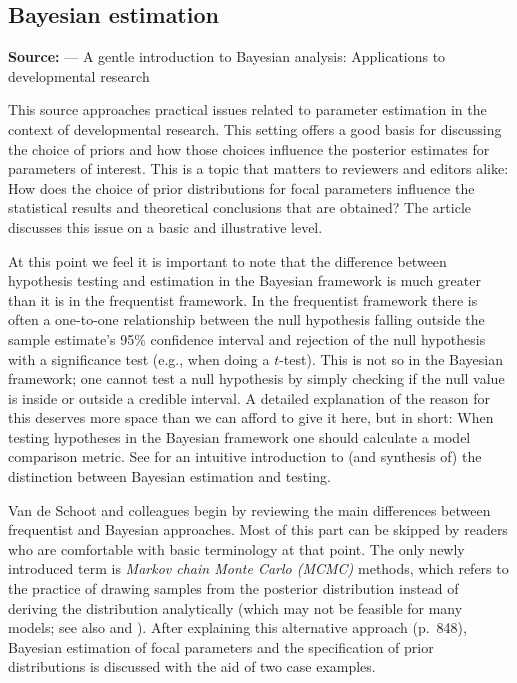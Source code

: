 \subsection{Bayesian estimation} 
\noindent\textbf{Source:}  --- A gentle introduction to Bayesian analysis: Applications to developmental research
\vspace{2mm}

This source approaches practical issues related to parameter estimation in the context of developmental research. This setting offers a good basis for discussing the choice of priors and how those choices influence the posterior estimates for parameters of interest. This is a topic that matters to reviewers and editors alike: How does the choice of prior distributions for focal parameters influence the statistical results and theoretical conclusions that are obtained? The article discusses this issue on a basic and illustrative level.

At this point we feel it is important to note that the difference between hypothesis testing and estimation in the Bayesian framework is much greater than it is in the frequentist framework. In the frequentist framework there is often a one-to-one relationship between the null hypothesis falling outside the sample estimate's 95\% confidence interval and rejection of the null hypothesis with a significance test (e.g., when doing a $t$-test). This is not so in the Bayesian framework; one cannot test a null hypothesis by simply checking if the null value is inside or outside a credible interval. A detailed explanation of the reason for this deserves more space than we can afford to give it here, but in short: When testing hypotheses in the Bayesian framework one should calculate a model comparison metric. See  for an intuitive introduction to (and synthesis of) the distinction between Bayesian estimation and testing.

Van de Schoot and colleagues \citeyear{schoot2014} begin by reviewing the main differences between frequentist and Bayesian approaches. Most of this part can be skipped by readers who are comfortable with basic terminology at that point. The only newly introduced term is \emph{Markov chain Monte Carlo (MCMC)} methods, which refers to the practice of drawing samples from the posterior distribution instead of deriving the distribution analytically (which may not be feasible for many models; see also  and ). After explaining this alternative approach (p.~848), Bayesian estimation of focal parameters and the specification of prior distributions is discussed with the aid of two case examples.

